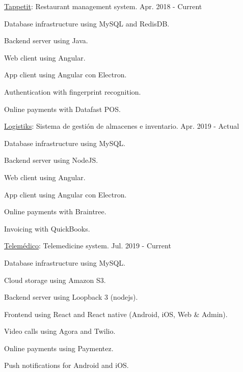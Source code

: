 \begin{cventries}
  \cventry
    {\href{https://tappetit.com}{Tappetit}: Restaurant management system.} %
    {} %
    {} %
    {Apr. 2018 - Current} %
    {
      \begin{cvitems} %
        \item {Database infrastructure using MySQL and RedisDB.}
        \item {Backend server using Java.}
        \item {Web client using Angular.}
        \item {App client using Angular con Electron.}
        \item {Authentication with fingerprint recognition.}
        \item {Online payments with Datafast POS.}
      \end{cvitems}
    }

  \cventry
    {\href{https://logistiksusa.com/}{Logistiks}: Sistema de gestión de almacenes e inventario.} %
    {} %
    {} %
    {Apr. 2019 - Actual} %
    {
      \begin{cvitems} %
        \item {Database infrastructure using MySQL.}
        \item {Backend server using NodeJS.}
        \item {Web client using Angular.}
        \item {App client using Angular con Electron.}
        \item {Online payments with Braintree.}
        \item {Invoicing with QuickBooks.}
      \end{cvitems}
    }

  \cventry
    {\href{https://telemedico.com.ec/}{Telemédico}: Telemedicine system.} %
    {} %
    {} %
    {Jul. 2019 - Current} %
    {
      \begin{cvitems} %
        \item {Database infrastructure using MySQL.}
        \item {Cloud storage using Amazon S3.}
        \item {Backend server using Loopback 3 (nodejs).}
        \item {Frontend using React and React native (Android, iOS, Web \& Admin).}
        \item {Video calls using Agora and Twilio.}
        \item {Online payments using Paymentez.}
        \item {Push notifications for Android and iOS.}
      \end{cvitems}
    }


\end{cventries}

